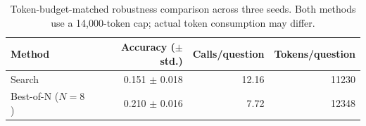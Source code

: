 \begin{table}[ht]
\centering
\small
\caption{Token-budget-matched robustness comparison across three seeds. Both methods use a 14,000-token cap; actual token consumption may differ.}
\label{tab:a7-token-matched}
\begin{tabular}{lrrr}
\toprule
Method & Accuracy ($\pm$ std.) & Calls/question & Tokens/question \\
\midrule
Search & 0.151 $\pm$ 0.018 & 12.16 & 11230 \\
Best-of-N ($N=8$) & 0.210 $\pm$ 0.016 & 7.72 & 12348 \\
\bottomrule
\end{tabular}
\end{table}

